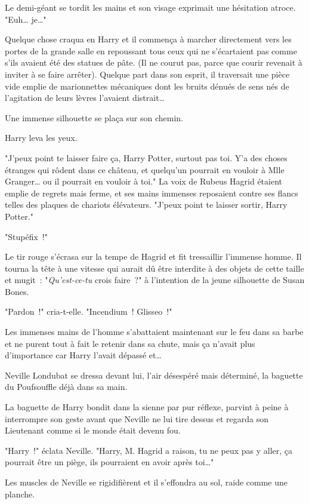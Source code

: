 Le demi-géant se tordit les mains et son visage exprimait une hésitation atroce. "Euh… je…"

Quelque chose craqua en Harry et il commença à marcher directement vers les portes de la grande salle en repoussant tous ceux qui ne s'écartaient pas comme s'ils avaient été des statues de pâte. (Il ne courut pas, parce que courir revenait à inviter à se faire arrêter). Quelque part dans son esprit, il traversait une pièce vide emplie de marionnettes mécaniques dont les bruits dénués de sens nés de l'agitation de leurs lèvres l'avaient distrait…

Une immense silhouette se plaça sur son chemin.

Harry leva les yeux.

"J'peux point te laisser faire ça, Harry Potter, surtout pas toi. Y'a des choses étranges qui rôdent dans ce château, et quelqu'un pourrait en vouloir à Mlle Granger… ou il pourrait en vouloir à toi." La voix de Rubeus Hagrid étaient emplie de regrets mais ferme, et ses mains immenses reposaient contre ses flancs telles des plaques de chariots élévateurs. "J'peux point te laisser sortir, Harry Potter."

"Stupéfix~!"

Le tir rouge s'écrasa sur la tempe de Hagrid et fit tressaillir l'immense homme. Il tourna la tête à une vitesse qui aurait dû être interdite à des objets de cette taille et mugit~: "\emph{Qu'est-ce-tu} crois faire~?" à l'intention de la jeune silhouette de Susan Bones.

"Pardon~!" cria-t-elle. "Incendium~! Glisseo~!"

Les immenses mains de l'homme s'abattaient maintenant sur le feu dans sa barbe et ne purent tout à fait le retenir dans sa chute, mais ça n'avait plus d'importance car Harry l'avait dépassé et…

Neville Londubat se dressa devant lui, l'air désespéré mais déterminé, la baguette du Poufsouffle déjà dans sa main.

La baguette de Harry bondit dans la sienne par pur réflexe, parvint à peine à interrompre son geste avant que Neville ne lui tire dessus et regarda son Lieutenant comme si le monde était devenu fou.

"Harry~!" éclata Neville. "Harry, M. Hagrid a raison, tu ne peux pas y aller, ça pourrait être un piège, ils pourraient en avoir après toi…"

Les muscles de Neville se rigidifièrent et il s'effondra au sol, raide comme une planche.

